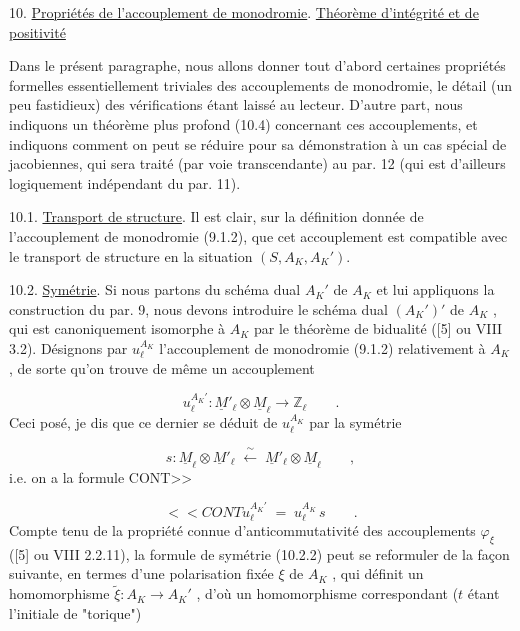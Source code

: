 

10. \underline{Propriétés de l'accouplement de monodromie}. \underline{Théorème d'intégrité et de positivité}

Dans le présent paragraphe, nous allons donner tout d'abord certaines propriétés formelles essentiellement triviales des accouplements de monodromie, le détail (un peu fastidieux) des vérifications étant laissé au lecteur. D'autre part, nous indiquons un théorème plus profond (10.4) concernant ces accouplements, et indiquons comment on peut se réduire pour sa démonstration à un cas spécial de jacobiennes, qui sera traité (par voie transcendante) au par. 12 (qui est d'ailleurs logiquement indépendant du par. 11).

10.1. \underline{Transport de structure}. Il est clair, sur la définition donnée de l'accouplement de monodromie (9.1.2), que cet accouplement est compatible avec le transport de structure en la situation $(S,A_K,A_K')$.

10.2. \underline{Symétrie}. Si nous partons du schéma dual $A_K'$ de $A_K$ et lui appliquons la construction du par. 9, nous devons introduire le schéma dual $(A_K')'$ de $A_K$ , qui est canoniquement isomorphe à $A_K$ par le théorème de bidualité ([5] ou VIII 3.2). Désignons par $u_\ell^{A_K}$ l'accouplement de monodromie (9.1.2) relativement à $A_K$ , de sorte qu'on trouve de même un accouplement

\begin{equation}\tag{10.2.1}
u_\ell^{A_K'} : \underline{M}'_\ell \otimes \underline{M}_\ell \longrightarrow \mathbb{Z}_\ell \qquad .
\end{equation}
Ceci posé, je dis que ce dernier se déduit de $u_\ell^{A_K}$ par la symétrie

\begin{equation*}
s : \underline{M}_\ell \otimes \underline{M}'_\ell \;\xleftarrow{\;\sim\;}\; \underline{M}'_\ell \otimes \underline{M}_\ell \qquad ,
\end{equation*}
i.e. on a la formule CONT>>



\begin{equation}\tag{10.2.2}
<<CONT u_\ell^{A_K'} \;=\; u_\ell^{A_K}\, s \qquad .
\end{equation}
Compte tenu de la propriété connue d'anticommutativité des accouplements $\varphi_\xi$ ([5] ou VIII 2.2.11), la formule de symétrie (10.2.2) peut se reformuler de la façon suivante, en termes d'une polarisation fixée $\xi$ de $A_K$ , qui définit un homomorphisme $\widetilde{\xi} : A_K \longrightarrow A_K'$ , d'où un homomorphisme correspondant ($t$ étant l'initiale de "torique")

